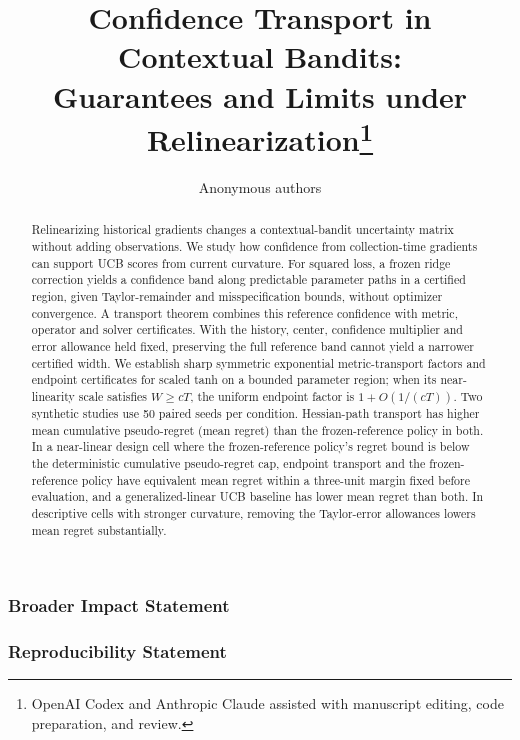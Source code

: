 \documentclass[10pt]{article}
\title{Confidence Transport in Contextual Bandits:\\Guarantees and Limits under Relinearization\thanks{OpenAI Codex and Anthropic Claude assisted with manuscript editing, code preparation, and review.}}
\author{Anonymous authors}
\begin{document}
\maketitle

\begin{abstract}
Relinearizing historical gradients changes a contextual-bandit uncertainty
matrix without adding observations. We study how confidence from
collection-time gradients can support UCB scores from current curvature. For
squared loss, a frozen ridge correction yields a confidence band along
predictable parameter paths in a certified region, given Taylor-remainder and
misspecification bounds, without optimizer convergence. A transport theorem
combines this reference confidence with metric, operator and solver
certificates. With the history, center, confidence multiplier and error
allowance held fixed, preserving the full reference band cannot yield a
narrower certified width. We establish sharp symmetric exponential
metric-transport factors and endpoint certificates for scaled tanh on a
bounded parameter region; when its near-linearity scale satisfies $W\ge cT$, the uniform
endpoint factor is $1+O(1/(cT))$. Two synthetic studies use 50 paired seeds
per condition. Hessian-path transport has higher mean cumulative pseudo-regret
(mean regret) than the frozen-reference policy in both. In a near-linear
design cell where the frozen-reference policy's regret bound is below the
deterministic cumulative pseudo-regret cap, endpoint transport and the
frozen-reference policy have equivalent mean regret within a three-unit margin
fixed before evaluation, and a generalized-linear UCB baseline has lower mean
regret than both. In descriptive cells with stronger curvature, removing the
Taylor-error allowances lowers mean regret substantially.
\end{abstract}

%







\subsubsection*{Broader Impact Statement}


\subsubsection*{Reproducibility Statement}

\end{document}
